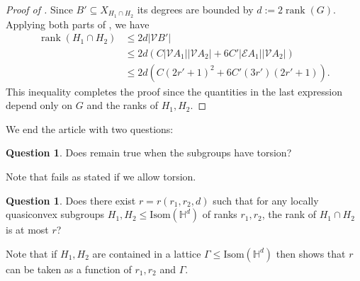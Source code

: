 \documentclass[article, 12pt]{amsart}
\numberwithin{equation}{section}
\theoremstyle{definition}
\newtheorem{question}[theorem]{Question}
\newcommand{\bbH}{\mathbb{H}}
\newcommand{\calE}{\mathcal{E}}
\newcommand{\calV}{\mathcal{V}}
\DeclareMathOperator{\rank}{rank}
\begin{document}
\begin{proof}[Proof of ]
        Since $B'\subseteq X_{H_1\cap H_2}$ its degrees are bounded by $d:=2\rank(G)$. 
       Applying both parts of , we have
        \begin{align*}
            \rank(H_1\cap H_2) &\le 2d|\calV B'| \\
            &\le 2d(C|\calV A_1||\calV A_2| + 6C'|\calE A_1||\calV A_2|)\\
            &\le 2d(C(2r'+1)^2 + 6C'(3r')(2r'+1)).
        \end{align*}
        This inequality completes the proof since the quantities in the last expression depend only on $G$ and the ranks of $H_1,H_2$.
\end{proof}


We end the article with two questions:

\begin{question}
    Does  remain true when the subgroups have torsion?
\end{question}

Note that  fails as stated if we allow torsion. 


\begin{question}
    Does there exist $r=r(r_1,r_2,d)$ such that for any locally quasiconvex subgroups $H_1,H_2\le \textrm{Isom}(\bbH^d)$ of ranks $r_1,r_2$, the rank of $H_1\cap H_2$ is at most $r$?
\end{question}
Note that if $H_1,H_2$ are contained in a lattice $\Gamma\le \textrm{Isom}(\bbH^d)$ then  shows that $r$ can be taken as a function of $r_1,r_2$ and $\Gamma$.





\end{document}
